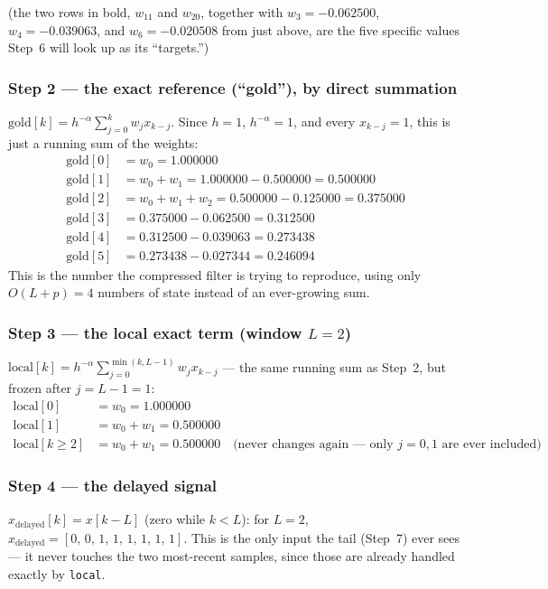 \documentclass[11pt]{article}
\begin{document}
(the two rows in bold, $w_{11}$ and $w_{20}$, together with $w_3=-0.062500$, $w_4=-0.039063$, and $w_6=-0.020508$ from just above, are the five specific values Step~6 will look up as its ``targets.'')

\subsubsection*{Step 2 --- the exact reference (``gold''), by direct summation}
$\text{gold}[k] = h^{-\alpha}\sum_{j=0}^{k} w_j x_{k-j}$. Since $h=1$, $h^{-\alpha}=1$, and every $x_{k-j}=1$, this is just a running sum of the weights:
\begin{align*}
\text{gold}[0] &= w_0 = 1.000000 \\
\text{gold}[1] &= w_0+w_1 = 1.000000-0.500000 = 0.500000 \\
\text{gold}[2] &= w_0+w_1+w_2 = 0.500000-0.125000 = 0.375000 \\
\text{gold}[3] &= 0.375000-0.062500 = 0.312500 \\
\text{gold}[4] &= 0.312500-0.039063 = 0.273438 \\
\text{gold}[5] &= 0.273438-0.027344 = 0.246094
\end{align*}
This is the number the compressed filter is trying to reproduce, using only $O(L{+}p)=4$ numbers of state instead of an ever-growing sum.

\subsubsection*{Step 3 --- the local exact term (window $L=2$)}
$\text{local}[k] = h^{-\alpha}\sum_{j=0}^{\min(k,L-1)} w_j x_{k-j}$ --- the same running sum as Step~2, but frozen after $j=L-1=1$:
\begin{align*}
\text{local}[0] &= w_0 = 1.000000 \\
\text{local}[1] &= w_0+w_1 = 0.500000 \\
\text{local}[k\ge 2] &= w_0+w_1 = 0.500000 \quad\text{(never changes again --- only $j=0,1$ are ever included)}
\end{align*}

\subsubsection*{Step 4 --- the delayed signal}
$x_{\text{delayed}}[k] = x[k-L]$ (zero while $k<L$): for $L=2$, $x_{\text{delayed}} = [0,\,0,\,1,\,1,\,1,\,1,\,1,\,1]$. This is the only input the tail (Step~7) ever sees --- it never touches the two most-recent samples, since those are already handled exactly by \texttt{local}.
\end{document}
